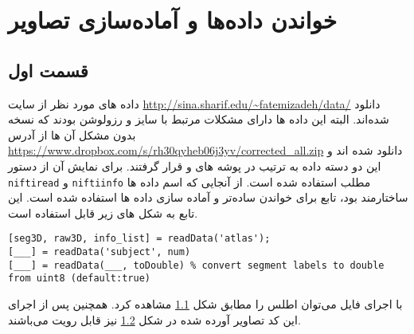 \chapter{خواندن داده‌ها و آماده‌سازی تصاویر}


\section{قسمت اول}
داده های مورد نظر از سایت \url{http://sina.sharif.edu/~fatemizadeh/data/} دانلود شده‌اند. 
البته این داده ها دارای مشکلات مرتبط با سایز و رزولوشن بودند که نسخه بدون مشکل آن ها از آدرس 
\url{https://www.dropbox.com/s/rh30qyheb06j3yv/corrected_all.zip}
دانلود شده اند و این دو دسته داده به ترتیب در پوشه های
  و  
 قرار گرفتند.
برای نمایش آن از دستور \verb|niftiread| و \verb|niftiinfo| مطلب استفاده شده است. از آنجایی که اسم داده ها ساختارمند بود، تابع   
 برای خواندن ساده‌تر و آماده سازی داده ها استفاده شده است. این تابع به شکل های زیر قابل استفاده است.
\begin{latin}
\begin{lstlisting}
[seg3D, raw3D, info_list] = readData('atlas');
[___] = readData('subject', num)
[___] = readData(___, toDouble) % convert segment labels to double from uint8 (default:true) 
\end{lstlisting}
\end{latin}



\begin{figure}[t!]
	\centering
	\removevspace
	\caption{}
	\label{fig:partA:Q1:showAtlas}
\end{figure}

\begin{figure}
	\centering
	\caption{}
	\label{fig:partA1:showSubjects}
\end{figure}






با اجرای فایل  می‌توان اطلس را مطابق شکل \ref{fig:partA:Q1:showAtlas} 
مشاهده کرد. همچنین پس از اجرای این کد تصاویر آورده شده در شکل \ref{fig:partA1:showSubjects} نیز قابل رویت می‌باشند.

